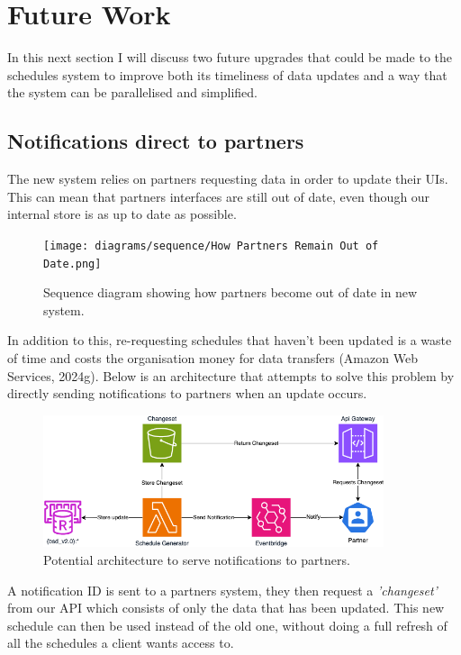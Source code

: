\section{Future Work}
\label{sec:future}
In this next section I will discuss two future upgrades that could be made to the schedules system to improve both its timeliness of data updates
and a way that the system can be parallelised and simplified.

\subsection{Notifications direct to partners}
The new system relies on partners requesting data in order to update their UIs. This can mean that partners interfaces are still out of date, even 
though our internal store is as up to date as possible.

\begin{figure}[H]
  \centering
  \texttt{[image: diagrams/sequence/How Partners Remain Out of Date.png]}
  \caption{Sequence diagram showing how partners become out of date in new system.}
  \label{fig:sequenceOutOfDate}
\end{figure}

In addition to this, re-requesting schedules that haven't been updated is a waste of time and costs the organisation money for data 
transfers (Amazon Web Services, 2024g). Below is an architecture that attempts to solve this problem by directly sending notifications to 
partners when an update occurs.

\begin{figure}[H]
  \centering
  \includegraphics[width=10cm]{assets/architectures/changesets.drawio.png}
  \caption{Potential architecture to serve notifications to partners.}
  \label{fig:changsetArchitecture}
\end{figure}

A notification ID is sent to a partners system, they then request a \textit{'changeset'} from our API which consists of only the data that has been updated.
This new schedule can then be used instead of the old one, without doing a full refresh of all the schedules a client wants access to.

